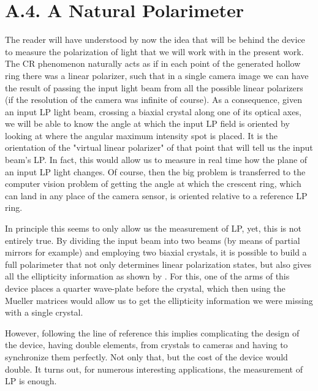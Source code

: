 \documentclass[11pt, a4paper, twoside]{article} %
\begin{document}
\section*{A.4. A Natural Polarimeter}
The reader will have understood by now the idea that will be behind the device to measure the polarization of light that we will work with in the present work. The CR phenomenon naturally acts as if in each point of the generated hollow ring there was a linear polarizer, such that in a single camera image we can have the result of passing the input light beam from all the possible linear polarizers (if the resolution of the camera was infinite of course). As a consequence, given an input LP light beam, crossing a biaxial crystal along one of its optical axes, we will be able to know the angle at which the input LP field is oriented by looking at where the angular maximum intensity spot is placed. It is the orientation of the "virtual linear polarizer" of that point that will tell us the input beam's LP. In fact, this would allow us to measure in real time how the plane of an input LP light changes. Of course, then the big problem is transferred to the computer vision problem of getting the angle at which the crescent ring, which can land in any place of the camera sensor, is oriented relative to a reference LP ring.

In principle this seems to only allow us the measurement of LP, yet, this is not entirely true. By dividing the input beam into two beams (by means of partial mirrors for example) and employing two biaxial crystals, it is possible to build a full polarimeter that not only determines linear polarization states, but also gives all the ellipticity information as shown by \cite{Stokes1, Stokes2}. For this, one of the arms of this device places a quarter wave-plate before the crystal, which then using the Mueller matrices would allow us to get the ellipticity information we were missing with a single crystal.

However, following the line of reference \cite{incomplete} this implies complicating the design of the device, having double elements, from crystals to cameras and having to synchronize them perfectly. Not only that, but the cost of the device would double. It turns out, for numerous interesting applications, the measurement of LP is enough. 
\end{document}
